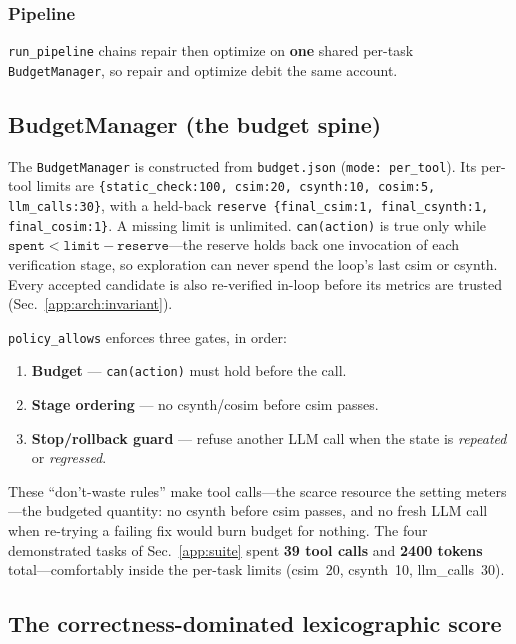 \subsubsection{Pipeline}
\texttt{run\_pipeline} chains repair then optimize on \textbf{one}
shared per-task \texttt{BudgetManager}, so repair and optimize debit the
same account.

\subsection{BudgetManager (the budget spine)}\label{app:arch:budget}

The \texttt{BudgetManager} is constructed from \texttt{budget.json}
(\texttt{mode: per\_tool}). Its per-tool limits are
\texttt{\{static\_check:100, csim:20, csynth:10, cosim:5,
llm\_calls:30\}}, with a held-back \texttt{reserve
\{final\_csim:1, final\_csynth:1, final\_cosim:1\}}. A missing limit is
unlimited. \texttt{can(action)} is true only while
$\texttt{spent} < \texttt{limit} - \texttt{reserve}$---the reserve holds back one
invocation of each verification stage, so exploration can never spend the loop's
last csim or csynth. Every accepted candidate is also re-verified in-loop before
its metrics are trusted (Sec.~\ref{app:arch:invariant}).

\texttt{policy\_allows} enforces three gates, in order:
\begin{enumerate}
  \item \textbf{Budget} --- \texttt{can(action)} must hold before the
    call.
  \item \textbf{Stage ordering} --- no csynth/cosim before csim passes.
  \item \textbf{Stop/rollback guard} --- refuse another LLM call when
    the state is \emph{repeated} or \emph{regressed}.
\end{enumerate}

These ``don't-waste rules'' make tool calls---the scarce resource the
setting meters---the budgeted quantity: no csynth before csim
passes, and no fresh LLM call when re-trying a failing fix would burn
budget for nothing. The four demonstrated tasks of Sec.~\ref{app:suite} spent
\textbf{39 tool calls} and \textbf{2400 tokens} total---comfortably inside the
per-task limits (csim~20, csynth~10, llm\_calls~30).

\subsection{The correctness-dominated lexicographic score}\label{app:arch:score}

